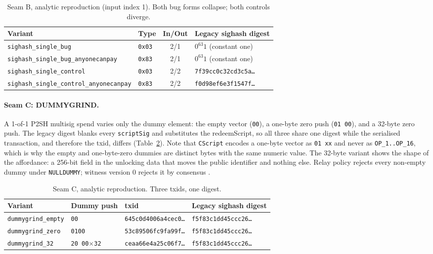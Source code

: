 \documentclass[11pt]{article}
\begin{document}
\begin{table}[t]
\centering
\small
\begin{tabular}{llcl}
\toprule
Variant & Type & In/Out & Legacy sighash digest \\
\midrule
\texttt{sighash\_single\_bug} & \texttt{0x03} & 2/1 & $0^{63}1$ (constant one) \\
\texttt{sighash\_single\_bug\_anyonecanpay} & \texttt{0x83} & 2/1 & $0^{63}1$ (constant one) \\
\texttt{sighash\_single\_control} & \texttt{0x03} & 2/2 & \texttt{7f39cc0c32cd3c5a\ldots} \\
\texttt{sighash\_single\_control\_anyonecanpay} & \texttt{0x83} & 2/2 & \texttt{f0d98ef6e3f1547f\ldots} \\
\bottomrule
\end{tabular}
\caption{Seam B, analytic reproduction (input index 1). Both bug forms collapse;
both controls diverge.}
\label{tab:seamB}
\end{table}

\paragraph{Seam C: DUMMYGRIND.} A 1-of-1 P2SH multisig spend varies only the
dummy element: the empty vector (\texttt{00}), a one-byte zero push
(\texttt{01 00}), and a 32-byte zero push. The legacy digest blanks every
\texttt{scriptSig} and substitutes the redeemScript, so all three share one
digest while the serialised transaction, and therefore the txid, differs
(Table~\ref{tab:seamC}). Note that \texttt{CScript} encodes a one-byte vector as
\texttt{01 xx} and never as \texttt{OP\_1..OP\_16}, which is why the empty and
one-byte-zero dummies are distinct bytes with the same numeric value. The
32-byte variant shows the shape of the affordance: a 256-bit field in the
unlocking data that moves the public identifier and nothing else. Relay policy
rejects every non-empty dummy under \texttt{NULLDUMMY}; witness version 0
rejects it by consensus \cite{bip147}.

\begin{table}[t]
\centering
\small
\begin{tabular}{llll}
\toprule
Variant & Dummy push & txid & Legacy sighash digest \\
\midrule
\texttt{dummygrind\_empty} & \texttt{00} & \texttt{645c0d4006a4cec0\ldots} & \texttt{f5f83c1dd45ccc26\ldots} \\
\texttt{dummygrind\_zero} & \texttt{0100} & \texttt{53c89506fc9fa99f\ldots} & \texttt{f5f83c1dd45ccc26\ldots} \\
\texttt{dummygrind\_32} & \texttt{20 00$\times$32} & \texttt{ceaa66e4a25c06f7\ldots} & \texttt{f5f83c1dd45ccc26\ldots} \\
\bottomrule
\end{tabular}
\caption{Seam C, analytic reproduction. Three txids, one digest.}
\label{tab:seamC}
\end{table}
\end{document}
